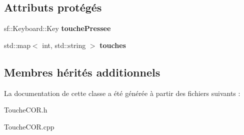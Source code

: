 \subsection*{Attributs protégés}
\begin{DoxyCompactItemize}
\item 
\mbox{\label{class_touche_c_o_r_a6e1284bbe6c15110225f7ebcdfc223e9}} 
sf\+::\+Keyboard\+::\+Key {\bfseries touche\+Pressee}
\item 
\mbox{\label{class_touche_c_o_r_abab2e2ae16b04f700ed74744b60856c9}} 
std\+::map$<$ int, std\+::string $>$ {\bfseries touches}
\end{DoxyCompactItemize}
\subsection*{Membres hérités additionnels}


La documentation de cette classe a été générée à partir des fichiers suivants \+:\begin{DoxyCompactItemize}
\item 
Touche\+C\+O\+R.\+h\item 
Touche\+C\+O\+R.\+cpp\end{DoxyCompactItemize}
